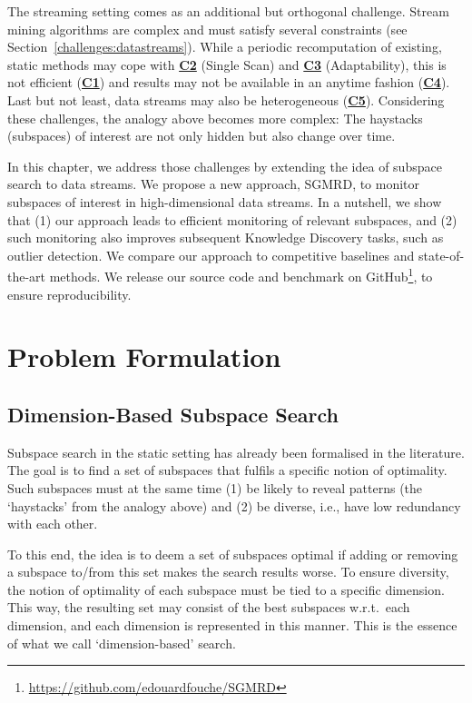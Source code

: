 The streaming setting comes as an additional but orthogonal challenge. 
Stream mining algorithms are complex and must satisfy several constraints \cite{doi:10.1198/1061860032544} (see Section~\ref{challenges:datastreams}). While a periodic recomputation of existing, static methods may cope with \hyperlink{C2}{\textbf{C2}} (Single Scan) and \hyperlink{C3}{\textbf{C3}} (Adaptability), this is not efficient (\hyperlink{C1}{\textbf{C1}}) and results may not be available in an anytime fashion (\hyperlink{C4}{\textbf{C4}}). Last but not least, data streams may also be heterogeneous (\hyperlink{C5}{\textbf{C5}}). Considering these challenges, the analogy above becomes more complex: The haystacks (subspaces) of interest are not only hidden but also change over time.%

In this chapter, we address those challenges by extending the idea of subspace search to data streams. We propose a new approach, \gls{SGMRD}, to monitor subspaces of interest in high-dimensional data streams. 
In a nutshell, we show that (1) our approach leads to efficient monitoring of relevant subspaces, and (2) such monitoring also improves subsequent Knowledge Discovery tasks, such as outlier detection. We compare our approach to competitive baselines and state-of-the-art methods. We release our source code and benchmark on GitHub\footnote{\url{https://github.com/edouardfouche/SGMRD}}, to ensure reproducibility. 

\section{Problem Formulation}

\subsection{Dimension-Based Subspace Search}

Subspace search in the static setting has already been formalised in the literature. The goal is to find a set of subspaces that fulfils a specific notion of optimality. Such subspaces must at the same time (1) be likely to reveal patterns (the `haystacks' from the analogy above) and (2) be diverse, i.e., have low redundancy with each other. 

To this end, the idea is to deem a set of subspaces optimal if adding or removing a subspace to/from this set makes the search results worse. 
To ensure diversity, the notion of optimality of each subspace must be tied to a specific dimension. This way, the resulting set may consist of the best subspaces w.r.t.\ each dimension, and each dimension is represented in this manner. This is the essence of what we call `dimension-based' search. 

